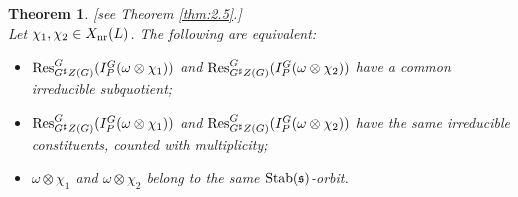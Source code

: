 \documentclass[11pt]{amsart}
\newtheorem{thmintro}{Theorem}
\theoremstyle{definition}
\begin{document}
\begin{thmintro}\label{thm:1} 
\textup{[see Theorem \ref{thm:2.5}.]} \\
Let $\chi_1,\chi_2 \in X_{{\rm nr}} (L)$. The following are equivalent:
\begin{itemize}
\item[(i)] ${{\rm Res}}^G_{G^\sharp Z(G)} (I_P^G (\omega \otimes \chi_1))$ and 
${{\rm Res}}^G_{G^\sharp Z(G)} (I_P^G (\omega \otimes \chi_2))$ 
have a common irreducible subquotient;
\item[(ii)] ${{\rm Res}}^G_{G^\sharp Z(G)} (I_P^G (\omega \otimes \chi_1))$ and
${{\rm Res}}^G_{G^\sharp Z(G)} (I_P^G (\omega \otimes \chi_2))$ 
have the same irreducible constituents,
counted with multiplicity;
\item[(iii)] $\omega \otimes \chi_1$ and $\omega \otimes \chi_2$ 
belong to the same ${{\rm Stab}}({{\mathfrak s}})$-orbit. 
\end{itemize}
\end{thmintro}
\end{document}
